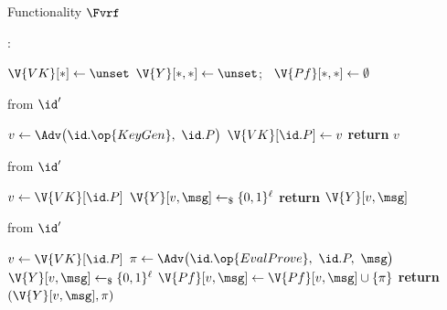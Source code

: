 \begin{interface}[nofloat]{Functionality $\Fvrf$ \\
\params{$\PID$, \quad $\Ps$, \quad $\admits$, \quad
$\uses := \{(\Adv,\serves)\}$, \quad $\pars := \ell$}}

{\scriptsize
\setlength{\columnsep}{1.4em}
\begin{multicols}{2}
:
\begin{algorithmic}[1]
\setcounter{contline}{0}\algcont
\State $\V{VK}[*] \gets \unset$
\State $\V{Y}[*,*] \gets \unset$; \ $\V{Pf}[*,*] \gets \emptyset$
\algsave
\end{algorithmic}
\vspace{1.4ex}

 \quad from $\id'$
\begin{algorithmic}[1]
\algcont
{}
\State $v \gets \Adv\bigl(\id.\op{KeyGen},\ \id.P\bigr)$
   \label{ln:vrfunique}
\EndIf
\State $\V{VK}[\id.P] \gets v$
\State \textbf{return} $v$
\algsave
\end{algorithmic}
\vspace{1.4ex}

 \quad from $\id'$
\begin{algorithmic}[1]
\algcont
{}
\State $v \gets \V{VK}[\id.P]$
  \State $\V{Y}[v, \msg] \gets_{\$} \{0,1\}^{\ell}$ \label{ln:vrfdraw}
\EndIf
\State \textbf{return} $\V{Y}[v, \msg]$ \label{ln:vrfvalue}
\algsave
\end{algorithmic}
\vspace{1.4ex}

\columnbreak

 \quad from $\id'$
\begin{algorithmic}[1]
\algcont
{}
\State $v \gets \V{VK}[\id.P]$
\State $\pi \gets \Adv\bigl(\id.\op{EvalProve},\ \id.P,\ \msg\bigr)$ \label{ln:vrfadvproof}
  \State $\V{Y}[v, \msg] \gets_{\$} \{0,1\}^{\ell}$
\EndIf
\State $\V{Pf}[v, \msg] \gets \V{Pf}[v, \msg] \cup \{\pi\}$ \label{ln:vrfaccept}
\State \textbf{return} $(\V{Y}[v, \msg], \pi)$
\algsave
\end{algorithmic}
\vspace{1.4ex}


\end{multicols}}
\end{interface}
